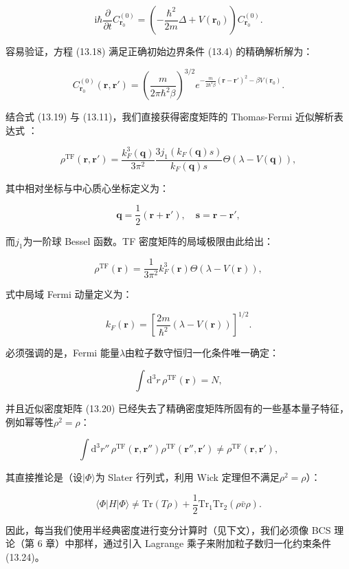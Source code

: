 \[
\mathrm{i}\hbar\frac{\partial}{\partial t}C^{(0)}_{\boldsymbol{r}_{0}}=\left(-\frac{\hbar^{2}}{2m}\Delta+V(\boldsymbol{r}_{0})\right)C^{(0)}_{\boldsymbol{r}_{0}}.
\]

容易验证，方程 (13.18) 满足正确初始边界条件 (13.4) 的精确解析解为：

\[
C^{(0)}_{\boldsymbol{r}_{0}}(\boldsymbol{r},\boldsymbol{r}')=\left(\frac{m}{2\pi\hbar^{2}\beta}\right)^{3/2}e^{-\frac{m}{2\hbar^{2}\beta}(\boldsymbol{r}-\boldsymbol{r}')^{2}-\beta V(\boldsymbol{r}_{0})}.
\]

结合式 (13.19) 与 (13.11)，我们直接获得密度矩阵的 Thomas-Fermi 近似解析表达式 \cite[第 29 章]{AS65}：

\[
\rho^{\mathrm{TF}}(\boldsymbol{r},\boldsymbol{r}')=\frac{k^{3}_{F}(\boldsymbol{q})}{3\pi^{2}}\frac{3j_{1}(k_{F}(\boldsymbol{q})s)}{k_{F}(\boldsymbol{q})s}\Theta(\lambda-V(\boldsymbol{q})),
\]

其中相对坐标与中心质心坐标定义为：

\[
\boldsymbol{q}=\frac{1}{2}(\boldsymbol{r}+\boldsymbol{r}'),\quad\boldsymbol{s}=\boldsymbol{r}-\boldsymbol{r}',
\]

而$j_{1}$为一阶球 Bessel 函数。TF 密度矩阵的局域极限由此给出：

\[
\rho^{\mathrm{TF}}(\boldsymbol{r})=\frac{1}{3\pi^{2}}k^{3}_{F}(\boldsymbol{r})\Theta(\lambda-V(\boldsymbol{r})),
\]

式中局域 Fermi 动量定义为：

\[
k_{F}(\boldsymbol{r})=\left[\frac{2m}{\hbar^{2}}(\lambda-V(\boldsymbol{r}))\right]^{1/2}.
\]

必须强调的是，Fermi 能量$\lambda$由粒子数守恒归一化条件唯一确定：

\[
\int\mathrm{d}^{3}r\,\rho^{\mathrm{TF}}(\boldsymbol{r})=N,
\]

并且近似密度矩阵 (13.20) 已经失去了精确密度矩阵所固有的一些基本量子特征，例如幂等性$\rho^{2}=\rho$：

\[
\int\mathrm{d}^{3}r''\,\rho^{\mathrm{TF}}(\boldsymbol{r},\boldsymbol{r}'')\rho^{\mathrm{TF}}(\boldsymbol{r}'',\boldsymbol{r}')\neq\rho^{\mathrm{TF}}(\boldsymbol{r},\boldsymbol{r}'),
\]

其直接推论是（设$|\Phi\rangle$为 Slater 行列式，利用 Wick 定理但不满足$\rho^{2}=\rho$）：

\[
\langle\Phi|H|\Phi\rangle\neq\mathrm{Tr}(T\rho)+\frac{1}{2}\mathrm{Tr}_{1}\mathrm{Tr}_{2}(\rho\bar{v}\rho).
\]

因此，每当我们使用半经典密度进行变分计算时（见下文），我们必须像 BCS 理论（第 6 章）中那样，通过引入 Lagrange 乘子来附加粒子数归一化约束条件
(13.24)。

